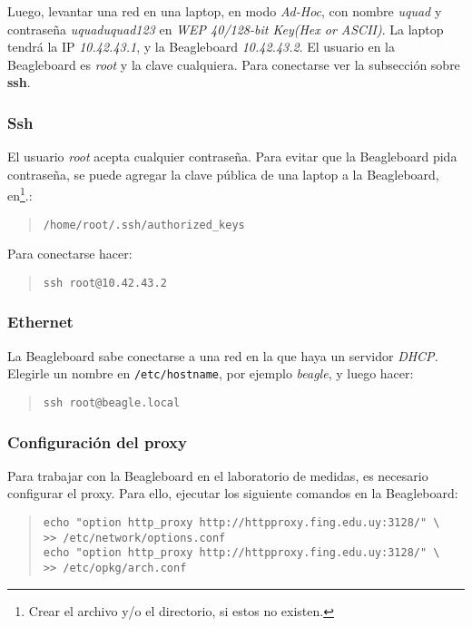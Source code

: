 \documentclass[main]{subfiles}
\begin{document}
Luego, levantar una red en una laptop, en modo \textit{Ad-Hoc}, con nombre \textit{uquad} y contraseña \textit{uquaduquad123} en \textit{WEP 40/128-bit Key(Hex or ASCII)}. La laptop tendrá la IP \textit{10.42.43.1}, y la Beagleboard \textit{10.42.43.2}. El usuario en la Beagleboard es \textit{root} y la clave cualquiera. Para conectarse ver la subsección sobre \textbf{ssh}.

\subsubsection{Ssh}
\label{sec:codigo:ssh}

El usuario \textit{root} acepta cualquier contraseña. Para evitar que la Beagleboard pida contraseña, se puede agregar la clave pública de una laptop a la Beagleboard, en\footnote{Crear el archivo y/o el directorio, si estos no existen.}.:
\begin{quote}
\begin{verbatim}
/home/root/.ssh/authorized_keys
\end{verbatim}
\end{quote}

Para conectarse hacer:
\begin{quote}
\begin{verbatim}
ssh root@10.42.43.2
\end{verbatim}
\end{quote}


\subsubsection{Ethernet}
\label{sec:codigo:ethernet}

La Beagleboard sabe conectarse a una red en la que haya un servidor \textit{DHCP}. Elegirle un nombre en \verb+/etc/hostname+, por ejemplo \textit{beagle}, y luego hacer:
\begin{quote}
\begin{verbatim}
ssh root@beagle.local
\end{verbatim}
\end{quote}

\subsubsection{Configuraci\'on del proxy}
\label{sec:codigo:proxy}

Para trabajar con la Beagleboard en el laboratorio de medidas, es necesario configurar el proxy. Para ello, ejecutar los siguiente comandos en la Beagleboard:
\begin{quote}
\begin{verbatim}
echo "option http_proxy http://httpproxy.fing.edu.uy:3128/" \
>> /etc/network/options.conf
echo "option http_proxy http://httpproxy.fing.edu.uy:3128/" \
>> /etc/opkg/arch.conf
\end{verbatim}
\end{quote}
\end{document}
